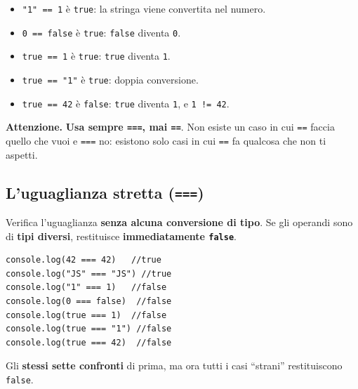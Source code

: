 \documentclass[10pt,a4paper]{article}
\newcommand{\avviso}[1]{\textbf{\textcolor{wamber}{Attenzione.}} #1}
\begin{document}
\begin{itemize}
  \item \texttt{"1" == 1} è \texttt{true}: la stringa viene convertita nel numero.
  \item \texttt{0 == false} è \texttt{true}: \texttt{false} diventa \texttt{0}.
  \item \texttt{true == 1} è \texttt{true}: \texttt{true} diventa \texttt{1}.
  \item \texttt{true == "1"} è \texttt{true}: doppia conversione.
  \item \texttt{true == 42} è \texttt{false}: \texttt{true} diventa \texttt{1}, e \texttt{1 != 42}.
\end{itemize}

\begin{warnbox}
\avviso{\textbf{Usa sempre \texttt{===}, mai \texttt{==}}. Non esiste un caso in cui \texttt{==} faccia quello che vuoi e \texttt{===} no: esistono solo casi in cui \texttt{==} fa qualcosa che non ti aspetti.}
\end{warnbox}

\subsection{L'uguaglianza stretta (\texttt{===})}

Verifica l'uguaglianza \textbf{senza alcuna conversione di tipo}. Se gli operandi sono di \textbf{tipi diversi}, restituisce \textbf{immediatamente \texttt{false}}.

\begin{lstlisting}[style=js]
console.log(42 === 42)   //true
console.log("JS" === "JS") //true
console.log("1" === 1)   //false
console.log(0 === false)  //false
console.log(true === 1)  //false
console.log(true === "1") //false
console.log(true === 42)  //false
\end{lstlisting}

Gli \textbf{stessi sette confronti} di prima, ma ora tutti i casi ``strani'' restituiscono \texttt{false}.
\end{document}
